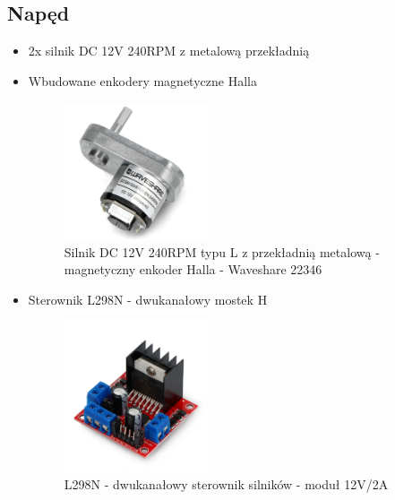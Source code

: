 \documentclass[a4paper,twoside,12pt]{book}
\begin{document}
\subsection{Napęd}
\begin{itemize}
\item 2x silnik DC 12V 240RPM z metalową przekładnią
\item Wbudowane enkodery magnetyczne Halla
\begin{figure}[!hb]
	\centering
	\includegraphics[width=0.4\textwidth]{images/sil.png}
	\caption{Silnik DC 12V 240RPM typu L z przekładnią metalową - magnetyczny enkoder Halla - Waveshare 22346}
	\label{fig:silnik}
	\end{figure}
	\newpage
\item Sterownik L298N - dwukanałowy mostek H \newline
\begin{figure}[!hb]
	\centering
	\includegraphics[width=0.4\textwidth]{images/ster.png}
	\caption{L298N - dwukanałowy sterownik silników - moduł 12V/2A}
	\label{fig:ster}
	\end{figure}
\end{itemize}
\end{document}
